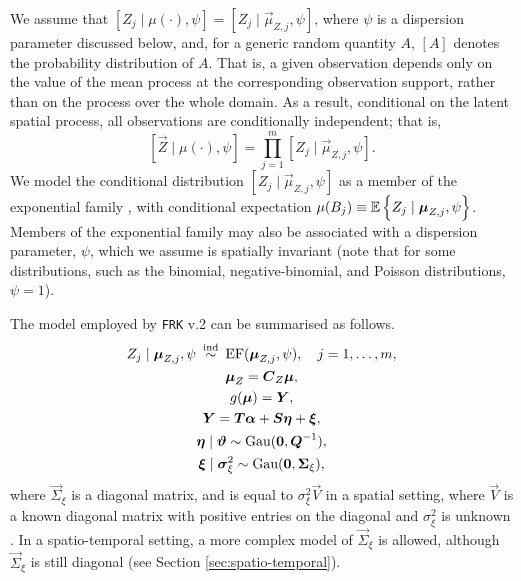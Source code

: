 \documentclass[12pt,a4paper]{article}
\begin{document}
We assume that $[Z_j \mid \mu(\cdot), \psi] = [Z_j \mid \vec{\mu}_{Z, j}, \psi]$, where $\psi$ is a dispersion parameter discussed below, and, for a generic random quantity $A$, $[A]$ denotes the probability distribution of $A$. 
That is, a given observation depends only on the value of the mean process at the corresponding observation support, rather than on the process over the whole domain. 
As a result, conditional on the latent spatial process, all observations are conditionally independent; that is, 
\[
[\vec{Z} \mid \mu(\cdot), \psi] = \prod_{j=1}^m[Z_j \mid \vec{\mu}_{Z, j}, \psi].
\]
We model the conditional distribution $[Z_j \mid \vec{\mu}_{Z, j}, \psi]$ as a member of the exponential family \citep[sec.~2.2.2]{McCullagh_Nelder_1989_GLM}, with conditional expectation 
$\muZgivenY{B_j} \equiv \ECurly{Z_j \mid \vec{\mu}_{Z, j}, \psi}$. 
Members of the exponential family may also be associated with a dispersion parameter, $\psi$, which we assume is spatially invariant (note that for some distributions, such as the binomial, negative-binomial, and Poisson distributions, $\psi = 1$).  

The model employed by \texttt{FRK} v.2 can be summarised as follows. 
\begin{gather}
    Z_j \mid \vec{\mu}_{Z,j}, \psi \inddist \text{EF}(\vec{\mu}_{Z,j}, \psi), \quad j = 1, \dots, m, \label{eqn:new_model_Z}\\
    \vec{\mu}_Z = \vec{C}_Z \vec{\mu}, \\
    g(\vec{\mu}) = \vec{Y}, \\
    \vec{Y} = \vec{T} \vec{\alpha} + \vec{S} \vec{\eta} + \vec{\xi}, \label{eqn:new_model_Y}\\
    \vec{\eta} \mid \vec{\vartheta} \sim \Gau(\vec{0}, \vec{Q}^{-1}), \\
    \vec{\xi} \mid \vec{\sigma}^2_\xi \sim \Gau(\vec{0}, \vec{\Sigma}_{\xi}) \label{eqn:new_model_priors},
\end{gather}
where $\vec{\Sigma}_{\xi}$ is a diagonal matrix, and is equal to $\sigma^2_\xi \vec{V}$ in a spatial setting, where $\vec{V}$ is a known diagonal matrix with positive entries on the diagonal and $\sigma^2_\xi$ is unknown . In a spatio-temporal setting, a more complex model of $\vec{\Sigma}_{\xi}$ is allowed, although $\vec{\Sigma}_{\xi}$ is still diagonal (see Section \ref{sec:spatio-temporal}).
\end{document}
